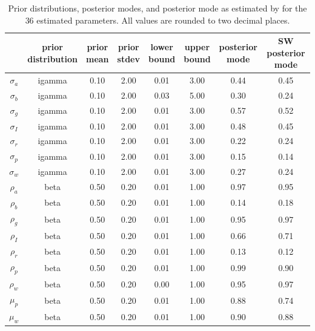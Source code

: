 \documentclass[11pt]{article}
\begin{document}
\begin{table}

\caption{\label{tab:parameter-estimate-table}Prior distributions, posterior modes, and posterior mode as
      estimated by \citet{SmetsWouters2007} for the 36 estimated
      parameters. All values are rounded to two decimal places.}
\centering
\fontsize{9}{11}\selectfont
\begin{tabular}[t]{cccccccc}
\toprule
 & \makecell[c]{prior\\distribution} & \makecell[c]{prior\\mean} & \makecell[c]{prior\\stdev} & \makecell[c]{lower\\bound} & \makecell[c]{upper\\bound} & \makecell[c]{posterior\\mode} & \makecell[c]{SW posterior\\mode}\\
\midrule
$\sigma_a$ & igamma & 0.10 & 2.00 & 0.01 & 3.00 & 0.44 & 0.45\\
$\sigma_b$ & igamma & 0.10 & 2.00 & 0.03 & 5.00 & 0.30 & 0.24\\
$\sigma_g$ & igamma & 0.10 & 2.00 & 0.01 & 3.00 & 0.57 & 0.52\\
$\sigma_I$ & igamma & 0.10 & 2.00 & 0.01 & 3.00 & 0.48 & 0.45\\
$\sigma_r$ & igamma & 0.10 & 2.00 & 0.01 & 3.00 & 0.22 & 0.24\\
\addlinespace
$\sigma_p$ & igamma & 0.10 & 2.00 & 0.01 & 3.00 & 0.15 & 0.14\\
$\sigma_w$ & igamma & 0.10 & 2.00 & 0.01 & 3.00 & 0.27 & 0.24\\
$\rho_a$ & beta & 0.50 & 0.20 & 0.01 & 1.00 & 0.97 & 0.95\\
$\rho_b$ & beta & 0.50 & 0.20 & 0.01 & 1.00 & 0.14 & 0.18\\
$\rho_g$ & beta & 0.50 & 0.20 & 0.01 & 1.00 & 0.95 & 0.97\\
\addlinespace
$\rho_I$ & beta & 0.50 & 0.20 & 0.01 & 1.00 & 0.66 & 0.71\\
$\rho_r$ & beta & 0.50 & 0.20 & 0.01 & 1.00 & 0.13 & 0.12\\
$\rho_p$ & beta & 0.50 & 0.20 & 0.01 & 1.00 & 0.99 & 0.90\\
$\rho_w$ & beta & 0.50 & 0.20 & 0.00 & 1.00 & 0.95 & 0.97\\
$\mu_p$ & beta & 0.50 & 0.20 & 0.01 & 1.00 & 0.88 & 0.74\\
\addlinespace
$\mu_w$ & beta & 0.50 & 0.20 & 0.01 & 1.00 & 0.90 & 0.88\\

\end{tabular}
\end{table}
\end{document}
